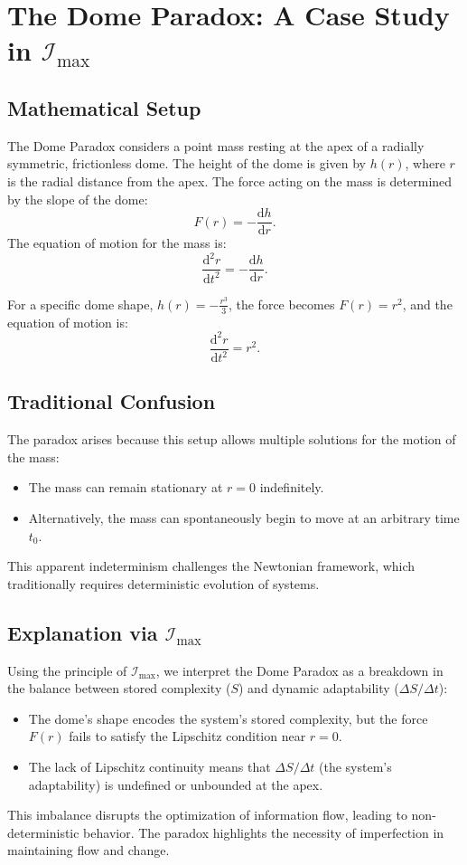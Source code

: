 \documentclass[12pt]{article}
\begin{document}
\section{The Dome Paradox: A Case Study in $\mathcal{I}_{\text{max}}$}

\subsection{Mathematical Setup}
The Dome Paradox considers a point mass resting at the apex of a radially symmetric, frictionless dome. The height of the dome is given by $h(r)$, where $r$ is the radial distance from the apex. The force acting on the mass is determined by the slope of the dome:
\begin{equation}
    F(r) = - \frac{\mathrm{d} h}{\mathrm{d} r}.
\end{equation}
The equation of motion for the mass is:
\begin{equation}
    \frac{\mathrm{d}^2 r}{\mathrm{d} t^2} = - \frac{\mathrm{d} h}{\mathrm{d} r}.
\end{equation}

For a specific dome shape, $h(r) = -\frac{r^3}{3}$, the force becomes $F(r) = r^2$, and the equation of motion is:
\begin{equation}
    \frac{\mathrm{d}^2 r}{\mathrm{d} t^2} = r^2.
\end{equation}

\subsection{Traditional Confusion}
The paradox arises because this setup allows multiple solutions for the motion of the mass:
\begin{itemize}
    \item The mass can remain stationary at $r = 0$ indefinitely.
    \item Alternatively, the mass can spontaneously begin to move at an arbitrary time $t_0$.
\end{itemize}
This apparent indeterminism challenges the Newtonian framework, which traditionally requires deterministic evolution of systems.

\subsection{Explanation via $\mathcal{I}_{\text{max}}$}
Using the principle of $\mathcal{I}_{\text{max}}$, we interpret the Dome Paradox as a breakdown in the balance between stored complexity ($S$) and dynamic adaptability ($\Delta S / \Delta t$):
\begin{itemize}
    \item The dome's shape encodes the system's stored complexity, but the force $F(r)$ fails to satisfy the Lipschitz condition near $r = 0$.
    \item The lack of Lipschitz continuity means that $\Delta S / \Delta t$ (the system's adaptability) is undefined or unbounded at the apex.
\end{itemize}
This imbalance disrupts the optimization of information flow, leading to non-deterministic behavior. The paradox highlights the necessity of imperfection in maintaining flow and change.
\end{document}
